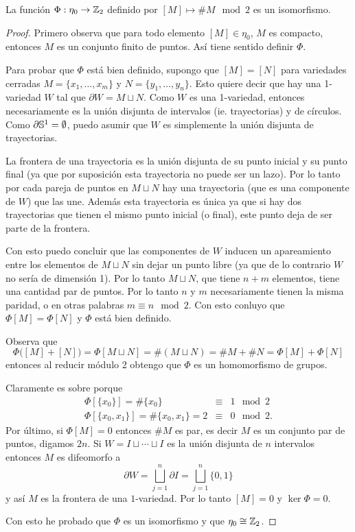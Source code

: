 \begin{ejercicio}\label{ej:41}
  La funci\'on $\Phi:\eta_0\rightarrow\mathbb{Z}_2$ definido por $[M]\mapsto \# M\mod 2$ es un isomorfismo.
\end{ejercicio}
\begin{proof}%
  Primero observa que para todo elemento $[M]\in\eta_0$, $M$ es compacto, entonces $M$ es un conjunto
  finito de puntos. As\'i tiene sentido definir $\Phi$.

  Para probar que $\Phi$ est\'a bien definido, supongo que $[M]=[N]$ para variedades cerradas
  $M=\{x_1,\ldots,x_m\}$ y $N=\{y_1,\ldots,y_n\}$. Esto quiere decir que hay una 1-variedad $W$
  tal que $\partial W= M \sqcup N$. Como $W$ es una 1-variedad, entonces necesariamente es la
  uni\'on disjunta de intervalos (ie. trayectorias) y de c\'irculos. Como $\partial\mathbb{S}^1=\emptyset$,
  puedo asumir que $W$ es simplemente la uni\'on disjunta de trayectorias.

  La frontera de una trayectoria es la uni\'on disjunta de su punto inicial y su punto final
  (ya que por suposici\'on esta trayectoria no puede ser un lazo). Por lo tanto por cada pareja
  de puntos en $M\sqcup N$ hay una trayectoria (que es una componente de $W$) que las une.
  Adem\'as esta trayectoria es \'unica ya que si hay dos trayectorias que tienen el mismo punto
  inicial (o final), este punto deja de ser parte de la frontera.

  Con esto puedo concluir que las componentes de $W$ inducen un apareamiento entre los elementos
  de $M\sqcup N$ sin dejar un punto libre (ya que de lo contrario $W$ no ser\'ia de dimensi\'on 1).
  Por lo tanto $M\sqcup N$, que tiene $n+m$ elementos, tiene una cantidad par de puntos.
  Por lo tanto $n$ y $m$ necesariamente tienen la misma paridad, o en otras palabras
  $m\equiv n\mod 2$. Con esto conluyo que $\Phi[M]=\Phi[N]$ y $\Phi$ est\'a bien definido.

  Observa que
  \[
    \Phi\big( [M]+[N]  \big)=\Phi[M\sqcup N]=\#(M\sqcup N)=\# M + \# N=\Phi[M]+\Phi[N]
  \]
  entonces al reducir m\'odulo 2 obtengo que $\Phi$ es un homomorfismo de grupos.

  Claramente es sobre porque
  \begin{eqnarray*}
    \Phi[\{x_0\}]  =  \#\{x_0\}&\equiv& 1 \mod 2 \\
    \Phi[\{x_0,x_1\}] =\#\{x_0,x_1\}= 2&\equiv& 0 \mod 2.
  \end{eqnarray*}
  Por \'ultimo, si $\Phi[M]=0$ entonces $\# M$ es par, es decir $M$ es un conjunto par de puntos,
  digamos $2n$. Si $W=I\sqcup\cdots\sqcup I$ es la uni\'on disjunta de $n$ intervalos entonces
  $M$ es difeomorfo a
  \[
    \partial W = \bigsqcup_{j=1}^n\partial I=\bigsqcup_{j=1}^n\{0,1\}
  \]
  y as\'i $M$ es la frontera de una $1$-variedad. Por lo tanto $[M]=0$ y $\ker\Phi=0$.

  Con esto he probado que $\Phi$ es un isomorfismo y que $\eta_0\cong\mathbb{Z}_2$.
\end{proof}%


